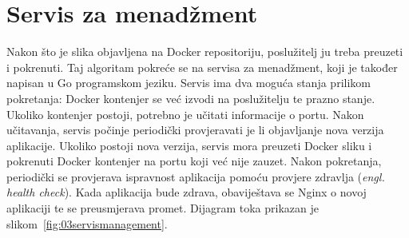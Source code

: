 \section{Servis za menadžment}
Nakon što je slika objavljena na Docker repositoriju, poslužitelj ju treba preuzeti i pokrenuti.
Taj algoritam pokreće se na servisa za menadžment, koji je također napisan u Go programskom jeziku.
Servis ima dva moguća stanja prilikom pokretanja: Docker kontenjer se već izvodi na poslužitelju te
prazno stanje. Ukoliko kontenjer postoji, potrebno je učitati informacije o portu. Nakon učitavanja,
servis počinje periodički provjeravati je li objavljanje nova verzija aplikacije.  Ukoliko postoji
nova verzija, servis mora preuzeti Docker sliku i pokrenuti Docker kontenjer na portu koji već nije
zauzet. Nakon pokretanja, periodički se provjerava ispravnost aplikacija pomoću provjere zdravlja
(\textit{engl. health check}). Kada aplikacija bude zdrava, obaviještava se Nginx o novoj aplikaciji
te se preusmjerava promet. Dijagram toka prikazan je slikom~\ref{fig:03servismanagement}.

